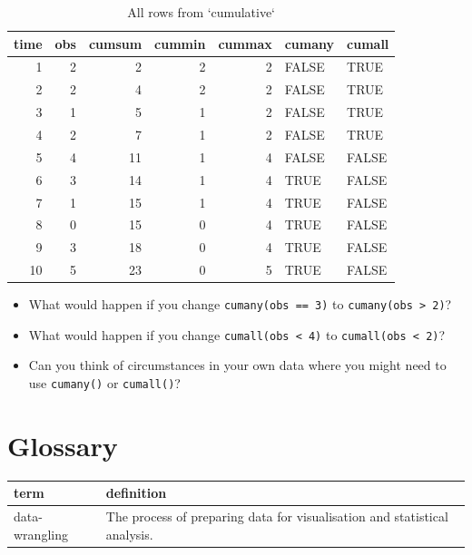 \documentclass[
  oneside]{book}
\providecommand{\tightlist}{%
  \setlength{\itemsep}{0pt}\setlength{\parskip}{0pt}}
\begin{document}
\begin{table}

\caption{\label{tab:unnamed-chunk-4}All rows from `cumulative`}
\centering
\begin{tabular}[t]{r|r|r|r|r|l|l}
\hline
time & obs & cumsum & cummin & cummax & cumany & cumall\\
\hline
1 & 2 & 2 & 2 & 2 & FALSE & TRUE\\
\hline
2 & 2 & 4 & 2 & 2 & FALSE & TRUE\\
\hline
3 & 1 & 5 & 1 & 2 & FALSE & TRUE\\
\hline
4 & 2 & 7 & 1 & 2 & FALSE & TRUE\\
\hline
5 & 4 & 11 & 1 & 4 & FALSE & FALSE\\
\hline
6 & 3 & 14 & 1 & 4 & TRUE & FALSE\\
\hline
7 & 1 & 15 & 1 & 4 & TRUE & FALSE\\
\hline
8 & 0 & 15 & 0 & 4 & TRUE & FALSE\\
\hline
9 & 3 & 18 & 0 & 4 & TRUE & FALSE\\
\hline
10 & 5 & 23 & 0 & 5 & TRUE & FALSE\\
\hline
\end{tabular}
\end{table}

\begin{try}

\begin{itemize}
\tightlist
\item
  What would happen if you change \texttt{cumany(obs\ ==\ 3)} to \texttt{cumany(obs\ \textgreater{}\ 2)}?
\item
  What would happen if you change \texttt{cumall(obs\ \textless{}\ 4)} to \texttt{cumall(obs\ \textless{}\ 2)}?
\item
  Can you think of circumstances in your own data where you might need to use \texttt{cumany()} or \texttt{cumall()}?
\end{itemize}

\end{try}

\hypertarget{glossary-dplyr}{%
\section{Glossary}\label{glossary-dplyr}}

\begin{tabular}{l|l}
\hline
term & definition\\
\hline
data-wrangling & The process of preparing data for visualisation and statistical analysis.\\
\hline
\end{tabular}
\end{document}
